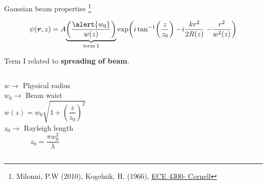 \documentclass[12pt, dvipsnames]{beamer}
\numberwithin{equation}{section}
\newcommand\blfootnote[1]{%
	\begingroup
	\renewcommand\thefootnote{}\footnote{#1}%
	\addtocounter{footnote}{-1}%
	\endgroup
}
\begin{document}
\begin{frame}[t]{Gaussian beam properties}\blfootnote{Milonni, P.W (2010), Kogelnik, H. (1966), \href{https://www.youtube.com/playlist?list=PLyWzPf87clvEb8T3Xf30tMaUqdbVchrNY}{ECE 4300- Cornell}}%
	\vspace{-16pt} 
	$$\psi(\boldsymbol{r},z)=A
	{\underbrace{\left(\frac{\alert{w_0}}{w(z)}\right)}_{\text{term I}}}
	\exp(
	{i\tan[-1](\frac{z}{z_0})}\;
	{-i\frac{kr^2}{2R(z)}}\;
	{-\frac{r^2}{w^2(z)}}
	)$$
{Term I related to \textbf{spreading of beam}.\\\vspace{5pt}\pause
	\begin{columns}
	$w\rightarrow$ Physical radius\\\pause
	{\color{red}$w_0\rightarrow$ Beam waist}\pause
	$$w(z)= w_0\sqrt{1+\left(\frac{z}{z_0}\right)^2}$$\pause
	$z_0\rightarrow$ Rayleigh length
	$$ z_0 = \frac{\pi w_0^2}{\lambda}$$ 
	
	
\end{columns}}

\end{frame}
\end{document}
